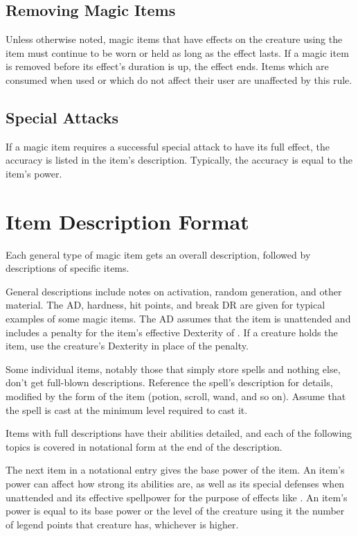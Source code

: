     \subsection{Removing Magic Items}
        Unless otherwise noted, magic items that have effects on the creature using the item must continue to be worn or held as long as the effect lasts.
        If a magic item is removed before its effect's duration is up, the effect ends.
        Items which are consumed when used or which do not affect their user are unaffected by this rule.

    \subsection{Special Attacks}

        If a magic item requires a successful special attack to have its full effect, the accuracy is listed in the item's description.
        Typically, the accuracy is equal to the item's power.

\section{Item Description Format}

    Each general type of magic item gets an overall description, followed by descriptions of specific items.

    General descriptions include notes on activation, random generation, and other material.
    The AD, hardness, hit points, and break DR are given for typical examples of some magic items.
    The AD assumes that the item is unattended and includes a  penalty for the item's effective Dexterity of .
    If a creature holds the item, use the creature's Dexterity in place of the  penalty.

    Some individual items, notably those that simply store spells and nothing else, don't get full-blown descriptions.
    Reference the spell's description for details, modified by the form of the item (potion, scroll, wand, and so on).
    Assume that the spell is cast at the minimum level required to cast it.

    Items with full descriptions have their abilities detailed, and each of the following topics is covered in notational form at the end of the description.

     The next item in a notational entry gives the base power of the item.
    An item's power can affect how strong its abilities are, as well as its special defenses when unattended and its effective spellpower for the purpose of effects like .
    An item's power is equal to its base power or the level of the creature using it \add the number of legend points that creature has, whichever is higher.

